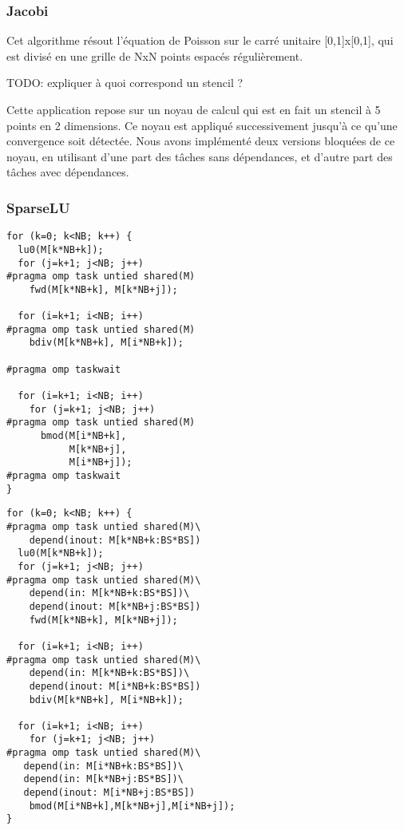 \subsubsection{Jacobi}

Cet algorithme résout l'équation de Poisson sur le carré unitaire [0,1]x[0,1], qui est divisé en une grille de NxN points espacés régulièrement.

TODO: expliquer à quoi correspond un stencil ?

Cette application repose sur un noyau de calcul qui est en fait un stencil à 5 points en 2 dimensions.
Ce noyau est appliqué successivement jusqu'à ce qu'une convergence soit détectée.
Nous avons implémenté deux versions bloquées de ce noyau, en utilisant d'une part des tâches sans dépendances, et d'autre part des tâches avec dépendances.

\subsubsection{SparseLU}

\begin{lstlisting}[caption=LU utilisant des tâches indépendantes,label=lst:kastors:sparseLU]
for (k=0; k<NB; k++) {
  lu0(M[k*NB+k]);
  for (j=k+1; j<NB; j++)
#pragma omp task untied shared(M)
    fwd(M[k*NB+k], M[k*NB+j]);

  for (i=k+1; i<NB; i++)
#pragma omp task untied shared(M)
    bdiv(M[k*NB+k], M[i*NB+k]);

#pragma omp taskwait

  for (i=k+1; i<NB; i++)
    for (j=k+1; j<NB; j++)
#pragma omp task untied shared(M)
      bmod(M[i*NB+k],
           M[k*NB+j],
           M[i*NB+j]);
#pragma omp taskwait
}
\end{lstlisting}

\begin{lstlisting}[caption=LU utilisant des tâches avec dépendances,label=lst:kastors:sparseLU-deps]
for (k=0; k<NB; k++) {
#pragma omp task untied shared(M)\
    depend(inout: M[k*NB+k:BS*BS])
  lu0(M[k*NB+k]);
  for (j=k+1; j<NB; j++)
#pragma omp task untied shared(M)\
    depend(in: M[k*NB+k:BS*BS])\
    depend(inout: M[k*NB+j:BS*BS])
    fwd(M[k*NB+k], M[k*NB+j]);

  for (i=k+1; i<NB; i++)
#pragma omp task untied shared(M)\
    depend(in: M[k*NB+k:BS*BS])\
    depend(inout: M[i*NB+k:BS*BS])
    bdiv(M[k*NB+k], M[i*NB+k]);

  for (i=k+1; i<NB; i++)
    for (j=k+1; j<NB; j++)
#pragma omp task untied shared(M)\
   depend(in: M[i*NB+k:BS*BS])\
   depend(in: M[k*NB+j:BS*BS])\
   depend(inout: M[i*NB+j:BS*BS])
    bmod(M[i*NB+k],M[k*NB+j],M[i*NB+j]);
}
\end{lstlisting}

